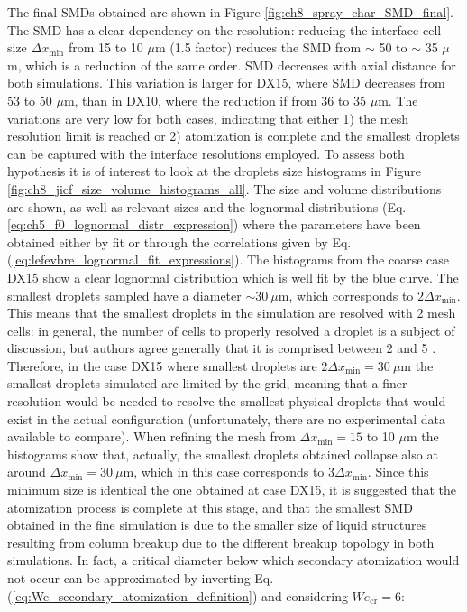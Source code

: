 The final SMDs obtained are shown in Figure \ref{fig:ch8_spray_char_SMD_final}. The SMD has a clear dependency on the resolution: reducing the interface cell size $\Delta x_\mathrm{min}$ from 15 to 10 $\mu$m (1.5 factor) reduces the SMD from $\sim$ 50 to $\sim$ 35 $\mu$m, which is a reduction of the same order. SMD decreases with axial distance for both simulations. This variation is larger for DX15, where SMD decreases from 53 to 50 $\mu$m, than in DX10, where the reduction if from 36 to 35 $\mu$m. The variations are very low for both cases, indicating that either 1) the mesh resolution limit is reached or 2) atomization is complete and the smallest droplets can be captured with the interface resolutions employed. To assess both hypothesis it is of interest to look at the droplets size histograms in Figure \ref{fig:ch8_jicf_size_volume_histograms_all}.  The size and volume distributions are shown, as well as relevant sizes and the lognormal distributions (Eq. \ref{eq:ch5_f0_lognormal_distr_expression}) where the parameters have been obtained either by fit or through the correlations given by Eq. (\ref{eq:lefevbre_lognormal_fit_expressions}). The histograms from the coarse case DX15 show a clear lognormal distribution which is well fit by the blue curve. The smallest droplets sampled have a diameter $\sim 30~\mu$m, which corresponds to $2\Delta x_\mathrm{min}$. This means that the smallest droplets in the simulation are resolved with 2 mesh cells: in general, the number of cells to properly resolved a droplet is a subject of discussion, but authors agree generally that it is comprised between 2  and 5 . Therefore, in the case DX15 where smallest droplets are $2\Delta x_\mathrm{min} = 30~\mu$m the smallest droplets simulated are limited by the grid, meaning that a finer resolution would be needed to resolve the smallest physical droplets that would exist in the actual configuration (unfortunately, there are no experimental data available to compare). When refining the mesh from $\Delta x_\mathrm{min} = 15$ to 10 $\mu$m the histograms show that, actually, the smallest droplets obtained collapse also at around $\Delta x_\mathrm{min} = 30~\mu$m, which in this case corresponds to $3 \Delta x_\mathrm{min}$. Since this minimum size is identical the one obtained at case DX15, it is suggested that the atomization process is complete at this stage, and that the smallest SMD obtained in the fine simulation is due to the smaller size of liquid structures resulting from column breakup due to the different breakup topology in both simulations. In fact, a critical diameter below which secondary atomization would not occur can be approximated by inverting Eq. (\ref{eq:We_secondary_atomization_definition}) and considering $We_\mathrm{cr} = 6$:

